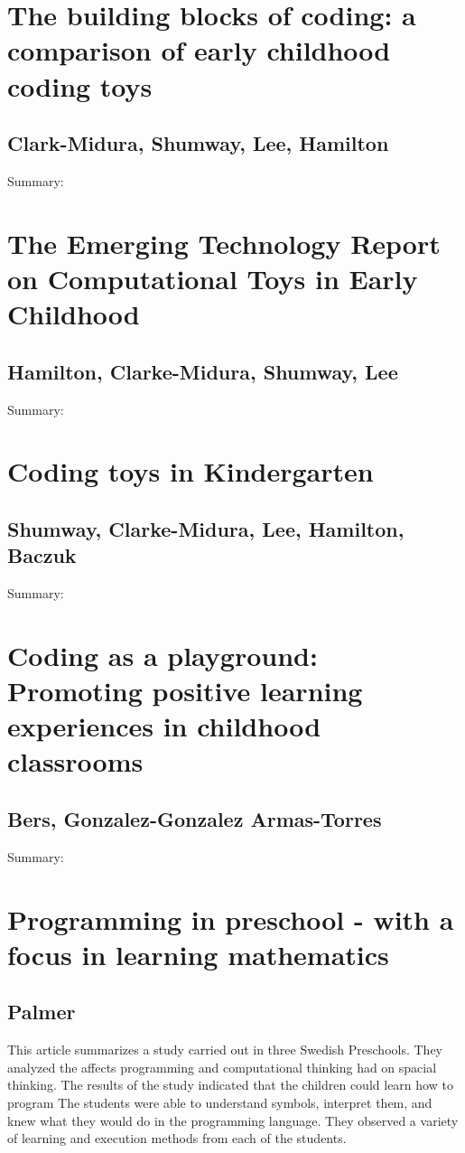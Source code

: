 \documentclass[12pt]{extarticle}
\begin{document}
{\section*{The building blocks of coding: a comparison of early childhood coding toys}
\subsection*{Clark-Midura, Shumway, Lee, Hamilton}
Summary:	

\section*{The Emerging Technology Report on Computational Toys in Early Childhood}
\subsection*{Hamilton, Clarke-Midura, Shumway, Lee}
Summary:	


\section*{Coding toys in Kindergarten}
\subsection*{Shumway, Clarke-Midura, Lee, Hamilton, Baczuk}
Summary:	


\section*{Coding as a playground: Promoting positive learning experiences in childhood classrooms}
\subsection*{Bers, Gonzalez-Gonzalez Armas-Torres}
Summary:	


\section*{Programming in preschool - with a focus in learning mathematics}
\subsection*{Palmer} 
This article summarizes a study carried out in three Swedish Preschools. They analyzed the affects programming and computational thinking had on spacial thinking. The results of the study indicated that the children could learn how to program The students were able to understand symbols, interpret them, and knew what they would do in the programming language. They observed a variety of learning and execution methods from each of the students. 


}
\end{document}
